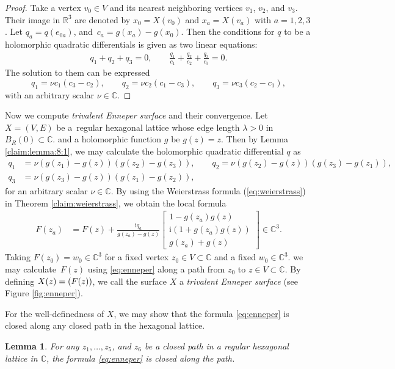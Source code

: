\documentclass[10pt,a4paper]{amsart}
\newcommand{\R}{\mathbb{R}}
\newcommand{\C}{\mathbb{C}}
\newcommand{\ii}{{\mathrm{i}}}
\let\Re\relax
\DeclareMathOperator{\Re}{Re}
\let\Re\relax
\DeclareMathOperator{\Re}{{\mathrm Re}}
\newcommand{\1}{{\bf 1}}
\numberwithin{equation}{section}
\newtheorem{Lemma}[Theorem]{Lemma}
\begin{document}
\begin{proof}
 Take a vertex $v_0 \in V$ and its nearest neighboring vertices $v_1$, $v_2$, and $v_3$.
 Their image in $\R^3$ are denoted by $x_0 =X(v_0)$ and $x_a =X(v_a)$ with $a=1,2,3$.
 Let $q_a= q(e_{0a})$, and~${c_a= g(x_a)-g(x_0)}$.
 Then the conditions for $q$ to be a holomorphic quadratic differentials is given as two linear equations:
 \begin{gather*}
 q_1+q_2+q_3=0,\qquad
 \frac{q_1}{c_1} + \frac{q_2}{c_2} + \frac{q_3}{c_3}=0.
 \end{gather*}
 The solution to them can be expressed
 \[%
 q_1= \nu c_1(c_3-c_2),
 \qquad
 q_2= \nu c_2(c_1-c_3),
 \qquad
 q_3= \nu c_3(c_2-c_1),
 \]
 with an arbitrary scalar $\nu \in \C$.
\end{proof}

Now we compute {\em trivalent Enneper surface} and their convergence.
Let $X = (V, E)$ be a~regular hexagonal lattice whose edge length $\lambda > 0$ in $B_R(0) \subset \C$.
and a holomorphic function $g$ be $g(z) = z$.
Then by Lemma \ref{claim:lemma:8:1}, we may calculate the holomorphic quadratic differential $q$ as
 \begin{align}
 q_1 &= \nu (g(z_1) - g(z))(g(z_2) - g(z_3)), \qquad
 q_2 = \nu (g(z_2) - g(z))(g(z_3) - g(z_1)), \nonumber\\
 q_3 &= \nu (g(z_3) - g(z))(g(z_1) - g(z_2)),  \label{eq:numerical:q}
 \end{align}
for an arbitrary scalar $\nu \in \C$.
By using the Weierstrass formula (\ref{eq:weierstrass}) in Theorem \ref{claim:weierstrass}, we obtain
the local formula
\begin{equation}
 \label{eq:enneper}
 \begin{aligned}
 F(z_a)
 &=
 F(z)
 +
 \frac{\ii q_a}{g(z_a) - g(z)}
 \begin{bmatrix}
 1-g(z_a)g(z)
 \\
 \ii(1+g(z_a)g(z))\\
 g(z_a) + g(z)
 \end{bmatrix}
 \in \C^3.
 \end{aligned}
\end{equation}
Taking $F(z_0) = w_0 \in \C^3$ for a fixed vertex $z_0 \in V \subset \C$ and a fixed $w_0 \in \C^3$.
we may calculate~$F(z)$ using \eqref{eq:enneper} along a path from $z_0$ to $z \in V \subset \C$.
By defining $X(z) = \Re(F(z))$,
we call the surface $X$ a {\em trivalent Enneper surface} (see Figure \ref{fig:enneper}).

For the well-definedness of $X$,
we may show that the formula \eqref{eq:enneper} is closed along any closed path in the hexagonal lattice.
\begin{Lemma}
 For any $z_1, \ldots, z_5$, and $z_6$ be a closed path in a regular hexagonal lattice in $\C$,
 the formula {\rm \eqref{eq:enneper}} is closed along the path.
\end{Lemma}
\end{document}
